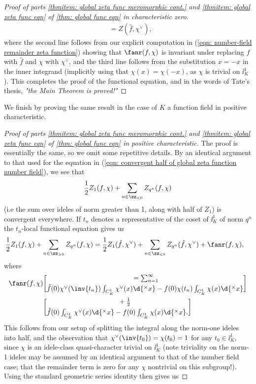 \documentclass[11pt, x11names, openany]{book}
\begin{document}
\begin{proof}[Proof of parts \ref{thmitem: global zeta func meromorphic cont.} and \ref{thmitem: global zeta func eqn} of \ref{thm: global func eqn} in characteristic zero]
\begin{align*}
&= Z(\hat{f}, \chi^\lor),
\end{align*}
where the second line follows from our explicit computation in (\ref{eqn: number-field remainder zeta function}) showing that $\fanr(f, \chi)$ is invariant under replacing $f$ with $\hat{f}$ and $\chi$ with $\chi^\lor$, and the third line follows from the substitution $x = -x$ in the inner integrand (implicitly using that $\chi(x) = \chi(-x)$, as $\chi$ is trivial on $\ii^1_K$).  This completes the proof of the functional equation, and in the words of Tate's thesis, \textit{"the Main Theorem is proved!"}
\end{proof} 

We finish by proving the same result in the case of $K$ a function field in positive characteristic.

\begin{proof}[Proof of parts \ref{thmitem: global zeta func meromorphic cont.} and \ref{thmitem: global zeta func eqn} of \ref{thm: global func eqn} in positive characteristic]
The proof is essentially the same, so we omit some repetitive details. By an identical argument to that used for the equation in (\ref{eqn: convergent half of global zeta function number field}), we see that
\begin{equation*}
    \frac{1}{2}Z_1(f, \chi) + \sum_{n \in \zz_{< 0}} Z_{q^n}(f, \chi)
\end{equation*}
(i.e the sum over ideles of norm greater than 1, along with half of $Z_1$) is convergent everywhere.  If $t_n$ denotes a representative of the coset of $\ii^1_K$ of norm $q^n$ the $t_n$-local functional equation gives us
\begin{align*}
    \frac{1}{2} Z_1(f, \chi) + \sum_{n \in \zz_{> 0}} Z_{q^n}(f, \chi) &= \frac{1}{2}Z_1(\hat{f}, \chi^\lor) + \sum_{n \in \zz_{< 0}} Z_{q^n}(\hat{f}, \chi^\lor) + \fanr(f, \chi),
\end{align*} 
where
 \begin{align*}
    \label{eqn: function field remainder zeta function}
    \fanr(f, \chi) &= \sum_{n = 1}^\infty \brack{\hat{f}(0) \chi^\lor(\inv{t_n}) \int_{C^1_K}\chi^\lor(x)\d{^\times x} - f(0) \chi(t_n) \int_{C^1_K} \chi(x)\d{^\times x}}\nonumber \\ 
    & \quad \quad  + \frac{1}{2} \brack{\hat{f}(0) \int_{C^1_K} \chi^\lor(x) \d{^\times x} - f(0) \int_{C^1_K} \chi(x) \d{^\times x}}.
 \end{align*}
This follows from our setup of splitting the integral along the norm-one ideles into half, and the observation that $\chi^\lor(\inv{t_0}) = \chi(t_0) = 1$ for any $t_0 \in \ii^1_K$, since $\chi$ is an idele-class quasi-character trivial on $\ii^1_K$ (note triviality on the norm-1 ideles may be assumed by an identical argument to that of the number field case; that the remainder term is zero for any $\chi$ nontrivial on this subgroup!). Using the standard geometric series identity then gives us

\end{proof}
\end{document}

